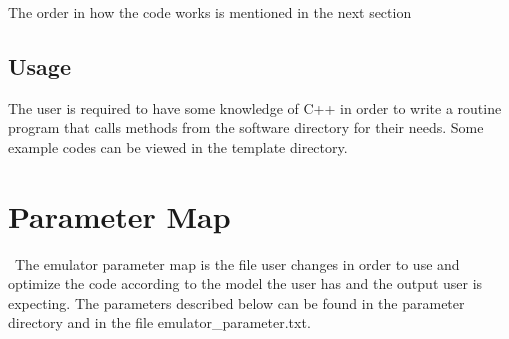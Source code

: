 \documentclass[12pt]{article}
\numberwithin{equation}{section}
\numberwithin{figure}{section}
\begin{document}
The order in how the code works is mentioned in the next section 


\subsection{Usage}

The user is required to have some knowledge of C++ in order to write a routine program that calls methods from the software directory for their needs. Some example codes can be viewed in the template directory.

\section{Parameter Map}

\ The emulator parameter map is the file user changes in order to use and optimize the code according to the model the user has and the output user is expecting. The parameters described below can be found in the parameter directory and in the file emulator\_parameter.txt. \\
\end{document}
